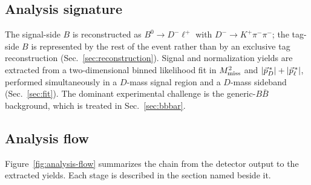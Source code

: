\subsection{Analysis signature}
\label{sec:intro:signature}
The signal-side $B$ is reconstructed as $B^{0} \to D^{-} \ell^{+}$ with
$D^{-} \to K^{+} \pi^{-} \pi^{-}$; the tag-side $B$ is represented by the
rest of the event rather than by an exclusive tag reconstruction
(Sec.~\ref{sec:reconstruction}).
Signal and normalization yields are extracted from a two-dimensional binned
likelihood fit in $M_{\mathrm{miss}}^{2}$ and $|\vec{p}^{\,*}_{D}| + |\vec{p}^{\,*}_{\ell}|$, performed simultaneously in a
$D$-mass signal region and a $D$-mass sideband (Sec.~\ref{sec:fit}).
The dominant experimental challenge is the generic-$B\bar{B}$ background,
which is treated in Sec.~\ref{sec:bbbar}.

\subsection{Analysis flow}
\label{sec:intro:flow}

Figure~\ref{fig:analysis-flow} summarizes the chain from the detector output to
the extracted yields.
Each stage is described in the section named beside it.

